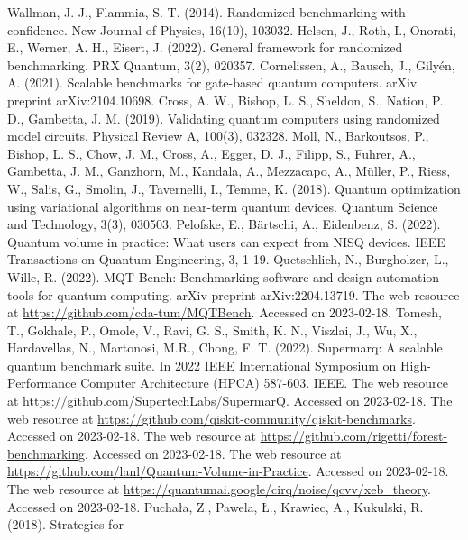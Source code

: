 \documentclass[preprint,12pt, a4paper, dvipsnames]{elsarticle}
\newcommand{\1}{{\rm 1\hspace{-0.9mm}l}}
\theoremstyle{definition}
\begin{document}
\begin{thebibliography}{00}
 Wallman, J. J.,  Flammia, S. T. (2014). Randomized benchmarking with confidence. New Journal of Physics, 16(10), 103032.
 Helsen, J., Roth, I., Onorati, E., Werner, A. H.,  Eisert, J. (2022). General framework for randomized benchmarking. PRX Quantum, 3(2), 020357.
 Cornelissen, A., Bausch, J.,  Gilyén, A. (2021). Scalable benchmarks for gate-based quantum computers. arXiv preprint arXiv:2104.10698.
Cross, A. W., Bishop, L. S., Sheldon, S., Nation, P. D., Gambetta, J. M. (2019). Validating quantum computers using randomized model circuits. Physical Review A, 100(3), 032328.
Moll, N., Barkoutsos, P., Bishop, L. S., Chow, J. M., Cross, A., Egger, D. J., Filipp, S., Fuhrer, A., Gambetta, J. M., Ganzhorn, M., Kandala, A., Mezzacapo, A., M{\"u}ller, P., Riess, W., Salis, G., Smolin, J., Tavernelli, I.,  Temme, K. (2018). Quantum optimization using variational algorithms on near-term quantum devices. Quantum Science and Technology, 3(3), 030503.
 Pelofske, E., Bärtschi, A.,  Eidenbenz, S. (2022). Quantum volume in practice: What users can expect from NISQ devices. IEEE Transactions on Quantum Engineering, 3, 1-19.
	 Quetschlich, N., Burgholzer, L., Wille, R. (2022). MQT Bench: Benchmarking software and design automation tools for quantum computing. arXiv preprint arXiv:2204.13719.
 The web resource at  \url{https://github.com/cda-tum/MQTBench}. Accessed on 2023-02-18.
	 Tomesh, T., Gokhale, P., Omole, V., Ravi, G. S., Smith, K. N., Viszlai, J., Wu, X.,  Hardavellas, N., Martonosi, M.R.,  Chong, F. T. (2022). Supermarq: A scalable quantum benchmark suite. In 2022 IEEE International Symposium on High-Performance Computer Architecture (HPCA) 587-603. IEEE.
 The web resource at \url{https://github.com/SupertechLabs/SupermarQ}. Accessed on 2023-02-18.
 The web resource at
\url{https://github.com/qiskit-community/qiskit-benchmarks}. Accessed on 2023-02-18.
 The web resource at \url{https://github.com/rigetti/forest-benchmarking}. Accessed on 2023-02-18.
 The web resource at \url{https://github.com/lanl/Quantum-Volume-in-Practice}. Accessed on 2023-02-18.
 The web resource at
\url{https://quantumai.google/cirq/noise/qcvv/xeb_theory}.  Accessed on 2023-02-18.
 Puchała, Z.,  Pawela, Ł.,  Krawiec, A.,  Kukulski, R. (2018). Strategies for

\end{thebibliography}
\end{document}
